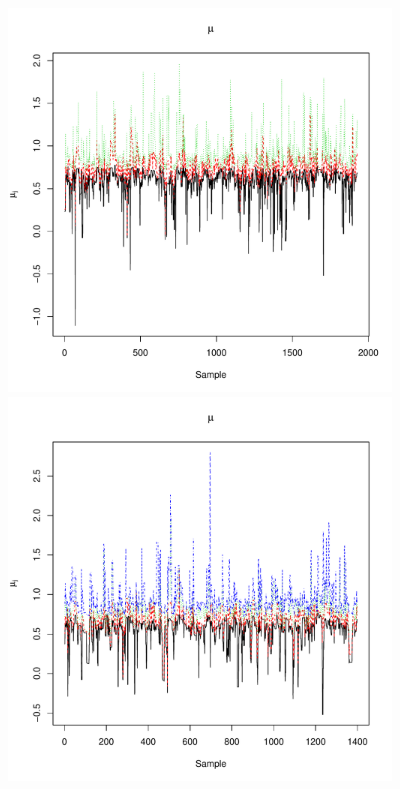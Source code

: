 \documentclass{article}
\begin{document}
\clearpage

\begin{figure}
	\begin{minipage}[h!]{0.49\textwidth}
		\centering
		\includegraphics[width=1\textwidth, height=4in]{muTrace3.pdf}
		\includegraphics[width=1\textwidth, height=4in]{muTrace4.pdf}
	\end{minipage}
	\begin{minipage}[h!]{0.49\textwidth}
		\centering

\end{minipage}
\end{figure}
\end{document}
